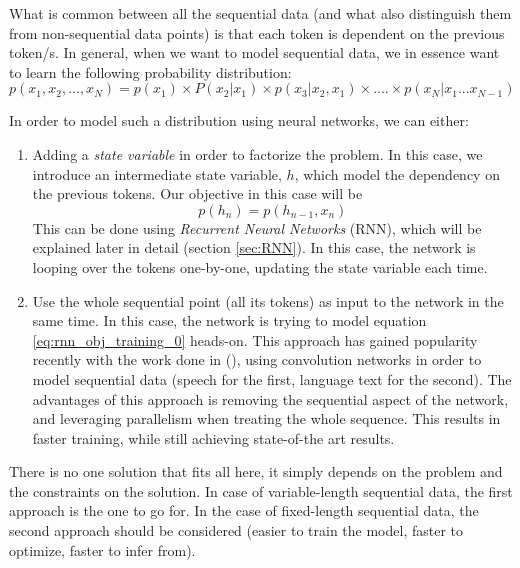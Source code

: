 \par What is common between all the sequential data (and what also distinguish them from non-sequential data points) is that each token is dependent on the previous token/s. In general, when we want to model sequential data, we in essence want to learn the following probability distribution:
\begin{equation}
    p(x_1, x_2, ..., x_N) = p(x_1) \times P(x_2|x_1) \times p(x_3|x_2, x_1) \times .... \times p(x_N|x_1 ... x_{N-1})
    \label{eq:rnn_obj_training_0}
\end{equation}

\par In order to model such a distribution using neural networks, we can either:
\begin{enumerate}[noitemsep]
    \item Adding a \textit{state variable} in order to factorize the problem. In this case, we introduce an intermediate state variable, $h$, which model the dependency on the previous tokens. Our objective in this case will be
    \begin{equation}
        p(h_n) = p(h_{n-1}, x_{n})
        \label{eq:rnn_factorization}
    \end{equation}
    This can be done using \textit{Recurrent Neural Networks} (RNN), which will be explained later in detail (section \ref{sec:RNN}). In this case, the network is looping over the tokens one-by-one, updating the state variable each time.
    \item Use the whole sequential point (all its tokens) as input to the network in the same time. In this case, the network is trying to model equation \ref{eq:rnn_obj_training_0} heads-on. This approach has gained popularity recently with the work done in (\citep{oord2016wavenet,gehring2017convolutional}), using convolution networks in order to model sequential data (speech for the first, language text for the second). The advantages of this approach is removing the sequential aspect of the network, and leveraging parallelism when treating the whole sequence. This results in faster training, while still achieving state-of-the art results.
\end{enumerate}

\par There is no one solution that fits all here, it simply depends on the problem and the constraints on the solution. In case of variable-length sequential data, the first approach is the one to go for. In the case of fixed-length sequential data, the second approach should be considered (easier to train the model, faster to optimize, faster to infer from).

